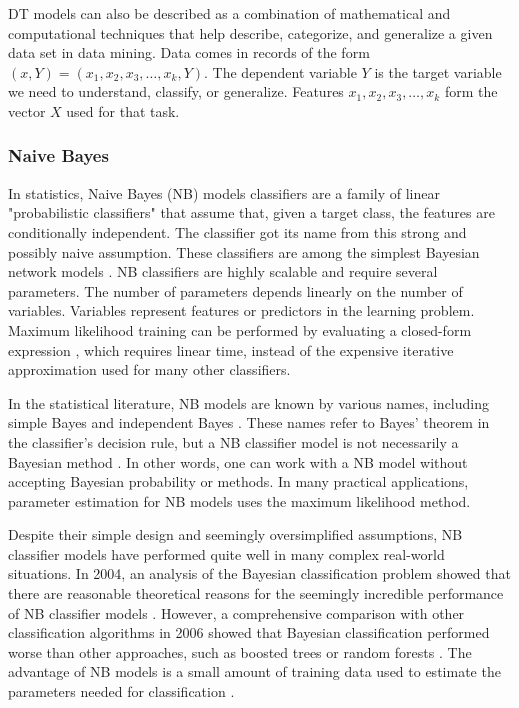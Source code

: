 \documentclass[sn-mathphys-num]{sn-jnl}%
\begin{document}
DT models can also be described as a combination of mathematical and computational techniques that help describe, categorize, and generalize a given data set in data mining. Data comes in records of the form $(x, Y) = (x_{1}, x_{2}, x_{3}, \ldots, x_{k}, Y)$. The dependent variable $Y$ is the target variable we need to understand, classify, or generalize. Features $x_{1}, x_{2}, x_{3}, \ldots, x_{k}$ form the vector $X$ used for that task.

\subsubsection{Naive Bayes}

In statistics, Naive Bayes (NB) models classifiers are a family of linear "probabilistic classifiers" that assume that, given a target class, the features are conditionally independent. The classifier got its name from this strong and possibly naive assumption. These classifiers are among the simplest Bayesian network models \cite{McCallum2011}. NB classifiers are highly scalable and require several parameters. The number of parameters depends linearly on the number of variables. Variables represent features or predictors in the learning problem. Maximum likelihood training can be performed by evaluating a closed-form expression \cite{Russell1999}, which requires linear time, instead of the expensive iterative approximation used for many other classifiers.

In the statistical literature, NB models are known by various names, including simple Bayes and independent Bayes \cite{Hand2001}. These names refer to Bayes' theorem in the classifier's decision rule, but a NB classifier model is not necessarily a Bayesian method \cite{Russell1999, Hand2001}. In other words, one can work with a NB model without accepting Bayesian probability or methods. In many practical applications, parameter estimation for NB models uses the maximum likelihood method.

Despite their simple design and seemingly oversimplified assumptions, NB classifier models have performed quite well in many complex real-world situations. In 2004, an analysis of the Bayesian classification problem showed that there are reasonable theoretical reasons for the seemingly incredible performance of NB classifier models \cite{Zhang2004}. However, a comprehensive comparison with other classification algorithms in 2006 showed that Bayesian classification performed worse than other approaches, such as boosted trees or random forests \cite{Caruana2006}. The advantage of NB models is a small amount of training data used to estimate the parameters needed for classification \cite{stackexchange}.
\end{document}
